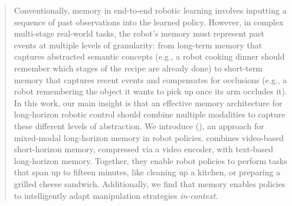 \begin{abstract}

Conventionally, memory in end-to-end robotic learning involves inputting a sequence of past observations into the learned policy. However, in complex multi-stage real-world tasks, the robot's memory must represent past events at multiple levels of granularity: from long-term memory that captures abstracted semantic concepts (e.g., a robot cooking dinner should remember which stages of the recipe are already done) to short-term memory that captures recent events and compensates for occlusions (e.g., a robot remembering the object it wants to pick up once its arm occludes it). In this work, our main insight is that an effective memory architecture for long-horizon robotic control should combine multiple modalities to capture these different levels of abstraction. We introduce \MethodName{} (\Acronym{}), an approach for mixed-modal long-horizon memory in robot policies. \Acronym{} combines video-based short-horizon memory, compressed via a video encoder, with text-based long-horizon memory. Together, they enable robot policies to perform tasks that span up to fifteen minutes, like cleaning up a kitchen, or preparing a grilled cheese sandwich. %
Additionally, we find that memory enables \Acronym{} policies to intelligently adapt manipulation strategies \emph{in-context}.


\end{abstract}
